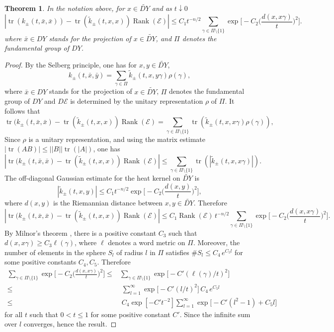 \documentclass[12pt]{amsart}
\theoremstyle{plain}
\newtheorem{theorem}{Theorem}[section]
\theoremstyle{definition}
\theoremstyle{remark}
\begin{document}
{\begin{theorem}
In the notation above,  for $x\in \widetilde{DY}$ and as $t\downarrow 0$
$$
|{\operatorname{tr}}(k_\pm(t,\bar x,\bar x)) - {\operatorname{tr}}(\widetilde k_\pm(t,x,x)){\operatorname{Rank}}({\mathcal E})|
  \le C_1t^{-n/2}\sum_{\gamma\in\Pi\setminus\{1\}}
  \exp\Big[-C_2\Big(\frac{d(x,x\gamma)}{t}\Big)^{2}\Big].   
$$
where $\bar x\in DY$ stands for the projection of $x\in\widetilde{DY}$, and $\Pi$ denotes the fundamental group of $DY$.
\end{theorem}

\begin{proof}
By the Selberg principle, one has for $x,y\in\widetilde{DY}$,
\[ k_{\pm}(t,\bar x,\bar y)=
   \sum_{\gamma\in\Pi}\widetilde k_\pm(t,x,y\gamma)\rho(\gamma),   
   \]
where $\bar x\in DY$ stands for the projection of $x\in\widetilde{DY}$, $\Pi$ denotes the fundamental group of $DY$
and $D{\mathcal E}$ is determined by the unitary representation $\rho$ of $\Pi$.
It follows that 
\[  {\operatorname{tr}}(k_{\pm}(t,\bar x,\bar x)-{\operatorname{tr}}(\widetilde k_\pm(t,x,x)) {\operatorname{Rank}}({\mathcal E})
    =\sum_{\gamma\in\Pi\setminus\{1\}}{\operatorname{tr}}(\widetilde k_\pm(t,x,x\gamma)\rho(\gamma)), 
      \]
Since $\rho$ is a unitary representation, and using the matrix estimate $|{\operatorname{tr}}(AB)| \le ||B||  {\operatorname{tr}}(|A|)$, one has
\[ |{\operatorname{tr}}(k_{\pm}(t,\bar x,\bar x)-{\operatorname{tr}}(\widetilde k_\pm(t,x,x)) {\operatorname{Rank}}({\mathcal E})|\le
   \sum_{\gamma\in\Pi\setminus\{1\}} {\operatorname{tr}}(|\widetilde k_\pm(t,x,x\gamma)|).  \]
The off-diagonal Gaussian estimate for the heat kernel on $\widetilde{DY}$ is
\cite{BrSu}
\[  |\widetilde k_\pm(t,x,y)|\le C_1t^{-n/2}
       \exp\Big[-C_2\Big(\frac{d(x,y)}{t}\Big)^{2}\Big],   \]
where $d(x,y)$ is the Riemannian distance between $x,y\in\widetilde{DY}$.
Therefore 
\[  |{\operatorname{tr}}(k_{\pm}(t,\bar x,\bar x)-{\operatorname{tr}}(\widetilde k_\pm(t,x,x)) {\operatorname{Rank}}({\mathcal E})|
  \le C_1{\operatorname{Rank}}({\mathcal E})\, t^{-n/2}\sum_{\gamma\in\Pi\setminus\{1\}}
  \exp\Big[-C_2\Big(\frac{d(x,x\gamma)}{t}\Big)^{2}\Big].   \]
By Milnor's theorem \cite{Mi}, there is a positive constant $C_3$ such that 
$d(x,x\gamma)\ge C_3\ell(\gamma)$, where $\ell$ denotes a word metric on $\Pi$.
Moreover, the number of elements in the sphere $S_l$ of radius $l$ in $\Pi$
satisfies $\#S_l\le C_4\,e^{C_5l}$ for some positive constants $C_4,C_5$.
Therefore
\begin{align*}
\sum_{\gamma\in\Pi\setminus\{1\}}
 \exp\Big[-C_2\Big(\frac{d(x,x\gamma)}{t}\Big)^{2}\Big]            
\le&\sum_{\gamma\in\Pi\setminus\{1\}}
 \exp\big[-C'(\ell(\gamma)/t)^{2}\big]                             \\ 
\le&\;\sum_{l=1}^\infty\exp\big[-C'(l/t)^{2}\big]\,C_4\,e^{C_5l} \\
\le&\;C_4\exp[-C't^{-2}]\sum_{l=1}^\infty
 \exp\big[-C'(l^{2}-1)+C_5l\big]                        
\end{align*}
for all $t$ such that $0<t\le1$ for some positive constant $C'$.
Since the infinite sum over $l$ converges, hence
the result.
\end{proof}

}
\end{document}
